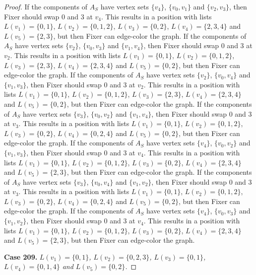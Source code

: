 \documentclass[12pt]{amsart}
\theoremstyle{plain}
\theoremstyle{definition}
\theoremstyle{remark}
\begin{document}
\begin{proof}
If the components of $A_S$ have vertex sets $\{v_4\}$, $\{v_0, v_1\}$ and $\{v_2, v_3\}$, then Fixer should swap 0 and 3 at $v_4$. This results in a position with lists $L(v_1) = \{0, 1\}$, $L(v_2) = \{0, 1, 2\}$, $L(v_3) = \{0, 2\}$, $L(v_4) = \{2, 3, 4\}$ and $L(v_5) = \{2, 3\}$, but then Fixer can edge-color the graph.
If the components of $A_S$ have vertex sets $\{v_2\}$, $\{v_0, v_3\}$ and $\{v_1, v_4\}$, then Fixer should swap 0 and 3 at $v_2$. This results in a position with lists $L(v_1) = \{0, 1\}$, $L(v_2) = \{0, 1, 2\}$, $L(v_3) = \{2, 3\}$, $L(v_4) = \{2, 3, 4\}$ and $L(v_5) = \{0, 2\}$, but then Fixer can edge-color the graph.
If the components of $A_S$ have vertex sets $\{v_2\}$, $\{v_0, v_4\}$ and $\{v_1, v_3\}$, then Fixer should swap 0 and 3 at $v_2$. This results in a position with lists $L(v_1) = \{0, 1\}$, $L(v_2) = \{0, 1, 2\}$, $L(v_3) = \{2, 3\}$, $L(v_4) = \{2, 3, 4\}$ and $L(v_5) = \{0, 2\}$, but then Fixer can edge-color the graph.
If the components of $A_S$ have vertex sets $\{v_3\}$, $\{v_0, v_2\}$ and $\{v_1, v_4\}$, then Fixer should swap 0 and 3 at $v_3$. This results in a position with lists $L(v_1) = \{0, 1\}$, $L(v_2) = \{0, 1, 2\}$, $L(v_3) = \{0, 2\}$, $L(v_4) = \{0, 2, 4\}$ and $L(v_5) = \{0, 2\}$, but then Fixer can edge-color the graph.
If the components of $A_S$ have vertex sets $\{v_4\}$, $\{v_0, v_2\}$ and $\{v_1, v_3\}$, then Fixer should swap 0 and 3 at $v_4$. This results in a position with lists $L(v_1) = \{0, 1\}$, $L(v_2) = \{0, 1, 2\}$, $L(v_3) = \{0, 2\}$, $L(v_4) = \{2, 3, 4\}$ and $L(v_5) = \{2, 3\}$, but then Fixer can edge-color the graph.
If the components of $A_S$ have vertex sets $\{v_3\}$, $\{v_0, v_4\}$ and $\{v_1, v_2\}$, then Fixer should swap 0 and 3 at $v_3$. This results in a position with lists $L(v_1) = \{0, 1\}$, $L(v_2) = \{0, 1, 2\}$, $L(v_3) = \{0, 2\}$, $L(v_4) = \{0, 2, 4\}$ and $L(v_5) = \{0, 2\}$, but then Fixer can edge-color the graph.
If the components of $A_S$ have vertex sets $\{v_4\}$, $\{v_0, v_3\}$ and $\{v_1, v_2\}$, then Fixer should swap 0 and 3 at $v_4$. This results in a position with lists $L(v_1) = \{0, 1\}$, $L(v_2) = \{0, 1, 2\}$, $L(v_3) = \{0, 2\}$, $L(v_4) = \{2, 3, 4\}$ and $L(v_5) = \{2, 3\}$, but then Fixer can edge-color the graph.

\noindent\textbf{Case 209.  }\textit{$L(v_1) = \{0, 1\}$, $L(v_2) = \{0, 2, 3\}$, $L(v_3) = \{0, 1\}$, $L(v_4) = \{0, 1, 4\}$ and $L(v_5) = \{0, 2\}$.}


\end{proof}
\end{document}
